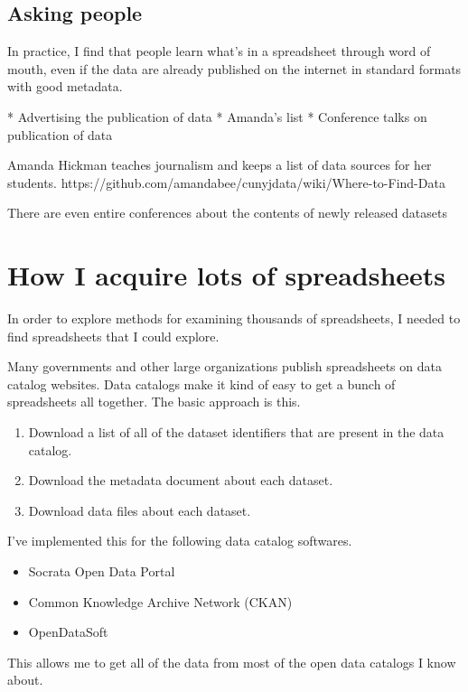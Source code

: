 \documentclass{acm_proc_article-sp}
\begin{document}
\subsection{Asking people}
In practice, I find that people learn what's in a spreadsheet through word
of mouth, even if the data are already published on the internet in standard
formats with good metadata.

* Advertising the publication of data
* Amanda's list
* Conference talks on publication of data

Amanda Hickman teaches journalism and keeps a list of data sources for her
students. \cite{amanda}
https://github.com/amandabee/cunyjdata/wiki/Where-to-Find-Data

There are even entire conferences about the contents of newly released datasets
\cite{apdu}

\section{How I acquire lots of spreadsheets} \label{acquire}
In order to explore methods for examining thousands of spreadsheets,
I needed to find spreadsheets that I could explore.

Many governments and other large organizations publish spreadsheets on
data catalog websites.
Data catalogs make it kind of easy to get a bunch of spreadsheets all together.
The basic approach is this.

\begin{enumerate}
\item Download a list of all of the dataset identifiers that are present in the data catalog.
\item Download the metadata document about each dataset.
\item Download data files about each dataset.
\end{enumerate}

I've implemented this for the following data catalog softwares.

\begin{itemize}
\item Socrata Open Data Portal
\item Common Knowledge Archive Network (CKAN)
\item OpenDataSoft
\end{itemize}

This allows me to get all of the data from most of the open data catalogs I know about.
\end{document}
